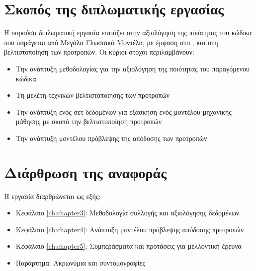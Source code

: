 \section{Σκοπός της διπλωματικής εργασίας}
Η παρούσα διπλωματική εργασία εστιάζει στην αξιολόγηση της ποιότητας του κώδικα που παράγεται από Μεγάλα Γλωσσικά Μοντέλα, με έμφαση στο , και στη βελτιστοποίηση των προτροπών. Οι κύριοι στόχοι περιλαμβάνουν:

\begin{itemize}
    \item Την ανάπτυξη μεθοδολογίας για την αξιολόγηση της ποιότητας του παραγόμενου κώδικα
    \item Τη μελέτη τεχνικών βελτιστοποίησης των προτροπών 
    \item Την ανάπτυξη ενός σετ δεδομένων για εξάσκηση ενός μοντέλου μηχανικής μάθησης με σκοπό την βελτιστοποίηση προτροπών 
    \item Την ανάπτυξη μοντέλου πρόβλεψης της απόδοσης των προτροπών
\end{itemize}

\section{Διάρθρωση της αναφοράς}
Η εργασία διαρθρώνεται ως εξής:

\begin{itemize}
    \item Κεφάλαιο \ref{ch:chapter3}: Μεθοδολογία συλλογής και αξιολόγησης δεδομένων
    \item Κεφάλαιο \ref{ch:chapter4}: Ανάπτυξη μοντέλου πρόβλεψης απόδοσης προτροπών  
    \item Κεφάλαιο \ref{ch:chapter5}: Συμπεράσματα και προτάσεις για μελλοντική έρευνα
    \item Παράρτημα: Ακρωνύμια και συντομογραφίες
\end{itemize}
